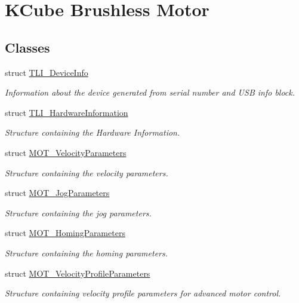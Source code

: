 \hypertarget{group___k_cube_brushless_motor}{}\section{K\+Cube Brushless Motor}
\label{group___k_cube_brushless_motor}
\subsection*{Classes}
\begin{DoxyCompactItemize}
\item 
struct \hyperlink{struct_t_l_i___device_info}{T\+L\+I\+\_\+\+Device\+Info}
\begin{DoxyCompactList}\small\item\em Information about the device generated from serial number and U\+SB info block. \end{DoxyCompactList}\item 
struct \hyperlink{struct_t_l_i___hardware_information}{T\+L\+I\+\_\+\+Hardware\+Information}
\begin{DoxyCompactList}\small\item\em Structure containing the Hardware Information. \end{DoxyCompactList}\item 
struct \hyperlink{struct_m_o_t___velocity_parameters}{M\+O\+T\+\_\+\+Velocity\+Parameters}
\begin{DoxyCompactList}\small\item\em Structure containing the velocity parameters. \end{DoxyCompactList}\item 
struct \hyperlink{struct_m_o_t___jog_parameters}{M\+O\+T\+\_\+\+Jog\+Parameters}
\begin{DoxyCompactList}\small\item\em Structure containing the jog parameters. \end{DoxyCompactList}\item 
struct \hyperlink{struct_m_o_t___homing_parameters}{M\+O\+T\+\_\+\+Homing\+Parameters}
\begin{DoxyCompactList}\small\item\em Structure containing the homing parameters. \end{DoxyCompactList}\item 
struct \hyperlink{struct_m_o_t___velocity_profile_parameters}{M\+O\+T\+\_\+\+Velocity\+Profile\+Parameters}
\begin{DoxyCompactList}\small\item\em Structure containing velocity profile parameters for advanced motor control. \end{DoxyCompactList}\item 

\end{DoxyCompactItemize}
